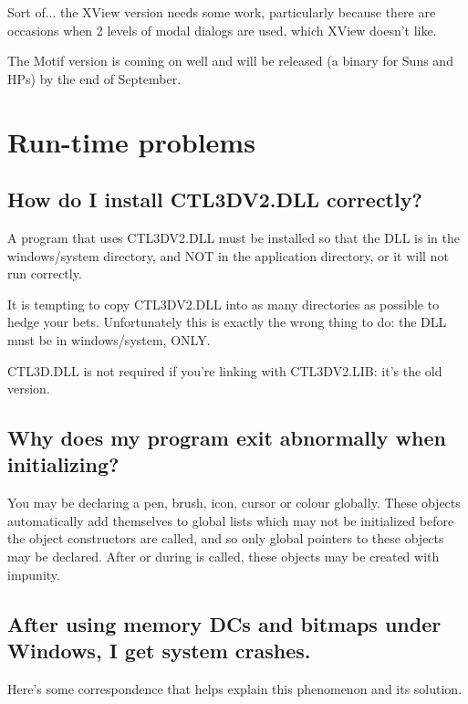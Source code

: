 Sort of... the XView version needs some work, particularly because there
are occasions when 2 levels of modal dialogs are used, which XView doesn't
like.

The Motif version is coming on well and will be released (a binary for Suns and HPs)
by the end of September.

\chapter{Run-time problems}

\section{How do I install CTL3DV2.DLL correctly?}

A program that uses CTL3DV2.DLL must be installed so that
the DLL is in the windows/system directory, and NOT in
the application directory, or it will not run correctly.

It is tempting to copy CTL3DV2.DLL into as many directories
as possible to hedge your bets. Unfortunately this is exactly
the wrong thing to do: the DLL must be in windows/system, ONLY.

CTL3D.DLL is not required if you're linking with CTL3DV2.LIB:
it's the old version.

\section{Why does my program exit abnormally when initializing?}

You may be declaring a pen, brush, icon, cursor or colour globally.
These objects automatically add themselves to global lists which may
not be initialized before the object constructors are called, and so
only global pointers to these objects may be declared. After or during
 is called, these objects may be created with impunity.

\section{After using memory DCs and bitmaps under Windows, I get system crashes.}

Here's some correspondence that helps explain this phenomenon and its
solution.

